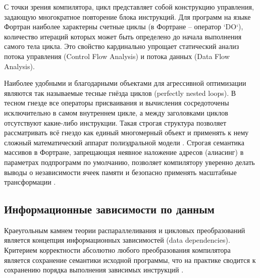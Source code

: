 \documentclass[14pt, russian]{scrartcl}
\begin{document}
С точки зрения компилятора, цикл представляет собой конструкцию управления, задающую многократное повторение блока инструкций. Для программ на языке Фортран наиболее характерны счетные циклы (в Фортране -- оператор `DO`), количество итераций которых может быть определено до начала выполнения самого тела цикла. Это свойство кардинально упрощает статический анализ потока управления (Control Flow Analysis) и потока данных (Data Flow Analysis).

Наиболее удобными и благодарными объектами для агрессивной оптимизации являются так называемые тесные гнёзда циклов (perfectly nested loops). В тесном гнезде все операторы присваивания и вычисления сосредоточены исключительно в самом внутреннем цикле, а между заголовками циклов отсутствуют какие-либо инструкции. Такая строгая структура позволяет рассматривать всё гнездо как единый многомерный объект и применять к нему сложный математический аппарат полиэдральной модели \cite{quillere2000}. Строгая семантика массивов в Фортране, запрещающая неявное наложение адресов (алиасинг) в параметрах подпрограмм по умолчанию, позволяет компилятору уверенно делать выводы о независимости ячеек памяти и безопасно применять масштабные трансформации \cite{feautrier1992affine}.

\subsection{Информационные зависимости по данным}

Краеугольным камнем теории распараллеливания и цикловых преобразований является концепция информационных зависимостей (data dependencies). Критерием корректности абсолютно любого преобразования компилятора является сохранение семантики исходной программы, что на практике сводится к сохранению порядка выполнения зависимых инструкций \cite{banerjee1988}.
\end{document}
